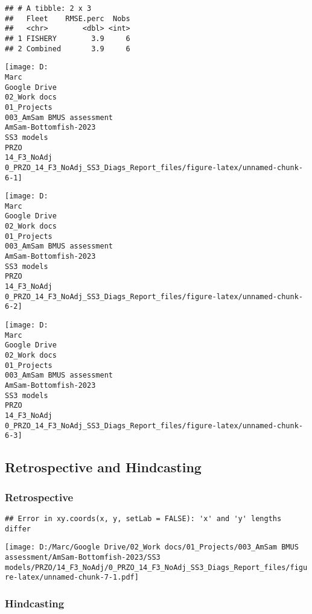 \documentclass[
]{article}
\begin{document}
\begin{verbatim}
## # A tibble: 2 x 3
##   Fleet    RMSE.perc  Nobs
##   <chr>        <dbl> <int>
## 1 FISHERY        3.9     6
## 2 Combined       3.9     6
\end{verbatim}

\begin{center}\texttt{[image: D:\\Marc\\Google Drive\\02\_Work docs\\01\_Projects\\003\_AmSam BMUS assessment\\AmSam-Bottomfish-2023\\SS3 models\\PRZO\\14\_F3\_NoAdj\\0\_PRZO\_14\_F3\_NoAdj\_SS3\_Diags\_Report\_files/figure-latex/unnamed-chunk-6-1]} \end{center}

\begin{center}\texttt{[image: D:\\Marc\\Google Drive\\02\_Work docs\\01\_Projects\\003\_AmSam BMUS assessment\\AmSam-Bottomfish-2023\\SS3 models\\PRZO\\14\_F3\_NoAdj\\0\_PRZO\_14\_F3\_NoAdj\_SS3\_Diags\_Report\_files/figure-latex/unnamed-chunk-6-2]} \end{center}

\begin{center}\texttt{[image: D:\\Marc\\Google Drive\\02\_Work docs\\01\_Projects\\003\_AmSam BMUS assessment\\AmSam-Bottomfish-2023\\SS3 models\\PRZO\\14\_F3\_NoAdj\\0\_PRZO\_14\_F3\_NoAdj\_SS3\_Diags\_Report\_files/figure-latex/unnamed-chunk-6-3]} \end{center}

\hypertarget{retrospective-and-hindcasting}{%
\subsection{Retrospective and
Hindcasting}\label{retrospective-and-hindcasting}}

\hypertarget{retrospective}{%
\subsubsection{Retrospective}\label{retrospective}}

\begin{verbatim}
## Error in xy.coords(x, y, setLab = FALSE): 'x' and 'y' lengths differ
\end{verbatim}

\texttt{[image: D:/Marc/Google Drive/02\_Work docs/01\_Projects/003\_AmSam BMUS assessment/AmSam-Bottomfish-2023/SS3 models/PRZO/14\_F3\_NoAdj/0\_PRZO\_14\_F3\_NoAdj\_SS3\_Diags\_Report\_files/figure-latex/unnamed-chunk-7-1.pdf]}

\hypertarget{hindcasting}{%
\subsubsection{Hindcasting}\label{hindcasting}}
\end{document}
